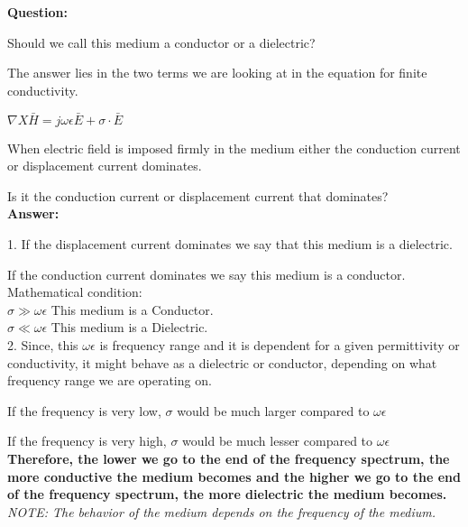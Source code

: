 	\textbf{Question:} 
	
	Should we call this medium a conductor or a dielectric? 
	
	The answer lies in the two terms we are looking at in the equation for finite conductivity.
	
	
	\begin{center}
		$\nabla X \bar{H} = j\omega\epsilon\bar{E} + \sigma\cdot\bar{E}$ 
	\end{center}
	
	
	When electric field is imposed firmly in the medium either the conduction current or displacement current dominates.
	
	Is it the conduction current or displacement current that dominates? \\
	
	\textbf{Answer:}
	
	1. If the displacement current dominates we say that this medium is a dielectric.
	
	If the conduction current dominates we say this medium is a conductor.\\
	
	Mathematical condition:\\
	
	$\sigma \gg \omega\epsilon$ This medium is a Conductor.\\
	
	$\sigma \ll \omega\epsilon$ This  medium is a Dielectric.\\
	
	2. Since, this $\omega\epsilon$ is frequency range and it is dependent for a given permittivity or conductivity, it might behave as a dielectric or conductor, depending on what frequency range we are operating on. 
	
	If the frequency is very low, $\sigma$ would be much larger compared to $\omega\epsilon$
	
	If the frequency is very high, $\sigma$ would be much lesser compared to $\omega\epsilon$\\
	
	\textbf{Therefore, the lower we go to the end of the frequency spectrum, the more conductive the medium becomes and the higher we go to the end of the frequency spectrum, the more dielectric the medium becomes.}\\
	
	\textit{NOTE: The behavior of the medium depends on the frequency of the medium.}\\
	
